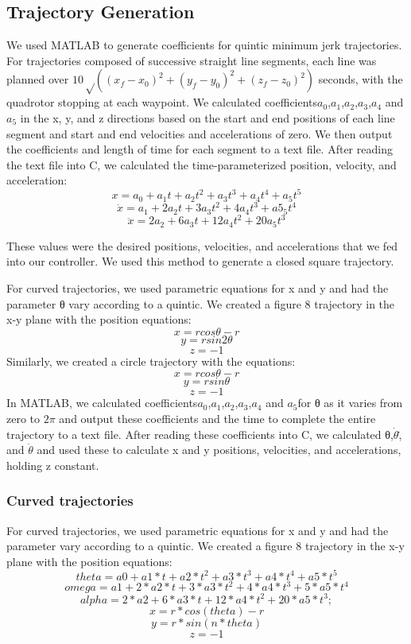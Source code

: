 \documentclass[english, twocolumn]{article}
\begin{document}
\subsection*{Trajectory Generation}
We used MATLAB to generate coefficients for quintic minimum jerk trajectories. For trajectories composed of successive straight line segments, each line was planned over $10√((x_f-x_0 )^2+(y_f-y_0 )^2+(z_f-z_0 )^2 )$ seconds, with the quadrotor stopping at each waypoint.  We calculated coefficients$ a_0$,$a_1$,$a_2$,$a_3$,$a_4$ and $a_5$ in the x, y, and z directions based on the start and end positions of each line segment and start and end velocities and accelerations of zero. We then output the coefficients and length of time for each segment to a text file. After reading the text file into C, we calculated the time-parameterized position, velocity, and acceleration: 
$$x= a_0+ a_1 t+a_2 t^2+ a_3 t^3+ a_4 t^4+a_5 t^5$$
$$\dot{x}=a_1+2a_2 t+ 3a_3 t^2+ 4a_4 t^3+a5_5 t^4$$
$$\ddot{x}=2a_2+ 6a_3 t+ 12a_4 t^2+20a_5 t^3$$

These values were the desired positions, velocities, and accelerations that we fed into our controller. We used this method to generate a closed square trajectory. 

For curved trajectories, we used parametric equations for x and y and had the parameter θ vary according to a quintic. We created a figure 8 trajectory in the x-y plane with the position equations: 
$$x=r cos⁡θ-r$$
$$y=r sin⁡2θ$$
$$z=-1$$
Similarly, we created a circle trajectory with the equations:
$$x=r cos⁡θ-r$$
$$y=r sin⁡θ$$
$$z=-1
$$
In MATLAB, we calculated coefficients$ a_0$,$a_1$,$a_2$,$a_3$,$a_4$ and $a_5$for θ as it varies from zero to $2\pi$ and output these coefficients and the time to complete the entire trajectory to a text file. After reading these coefficients into C, we calculated θ,$\dot{θ}$,̇ and $\ddot{θ }$  and used these to calculate x and y positions, velocities, and accelerations, holding z constant. 



\subsubsection*{Curved trajectories}
For curved trajectories, we used parametric equations for x and y and had the parameter  vary according to a quintic. We created a figure 8 trajectory in the x-y plane with the position equations: 
 $$theta = a0 + a1*t +a2*t^2 + a3*t^3 + a4*t^4 + a5*t^5 
 $$
 $$ omega = a1 + 2*a2*t + 3*a3*t^2 + 4*a4*t^3 + 5*a5*t^4
 $$
 $$ alpha = 2*a2 + 6*a3*t + 12*a4*t^2 + 20*a5*t^3;
 $$
 $$x = r*cos(theta)-r $$
 $$ y = r*sin(n*theta)$$
 $$  z = -1 $$
\end{document}
